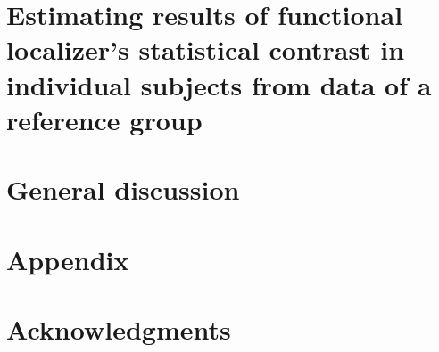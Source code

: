 \documentclass[english,12pt]{report}
\begin{document}
\begin{spacing}{1.5}
\chapter{Estimating results of functional localizer's statistical contrast in individual subjects from data of a reference group}






\chapter{General discussion}






% 







\chapter{Appendix}





\chapter*{Acknowledgments}










\end{spacing}
\end{document}
